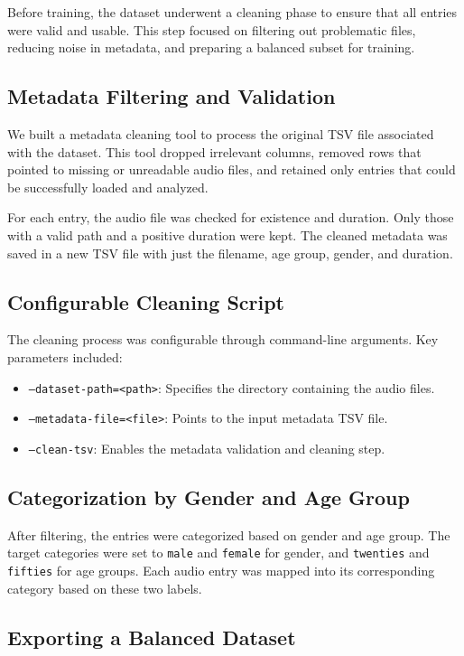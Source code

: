 \documentclass[a4paper,12pt]{article}
\begin{document}
Before training, the dataset underwent a cleaning phase to ensure that all entries were valid and usable. This step focused on filtering out problematic files, reducing noise in metadata, and preparing a balanced subset for training.

\subsection{Metadata Filtering and Validation}

We built a metadata cleaning tool to process the original TSV file associated with the dataset. This tool dropped irrelevant columns, removed rows that pointed to missing or unreadable audio files, and retained only entries that could be successfully loaded and analyzed.

For each entry, the audio file was checked for existence and duration. Only those with a valid path and a positive duration were kept. The cleaned metadata was saved in a new TSV file with just the filename, age group, gender, and duration.

\subsection{Configurable Cleaning Script}

The cleaning process was configurable through command-line arguments. Key parameters included:
\begin{itemize}
    \item \texttt{--dataset-path=<path>}: Specifies the directory containing the audio files.
    \item \texttt{--metadata-file=<file>}: Points to the input metadata TSV file.
    \item \texttt{--clean-tsv}: Enables the metadata validation and cleaning step.
\end{itemize}

\subsection{Categorization by Gender and Age Group}

After filtering, the entries were categorized based on gender and age group. The target categories were set to \texttt{male} and \texttt{female} for gender, and \texttt{twenties} and \texttt{fifties} for age groups. Each audio entry was mapped into its corresponding category based on these two labels.

\subsection{Exporting a Balanced Dataset}
\end{document}
